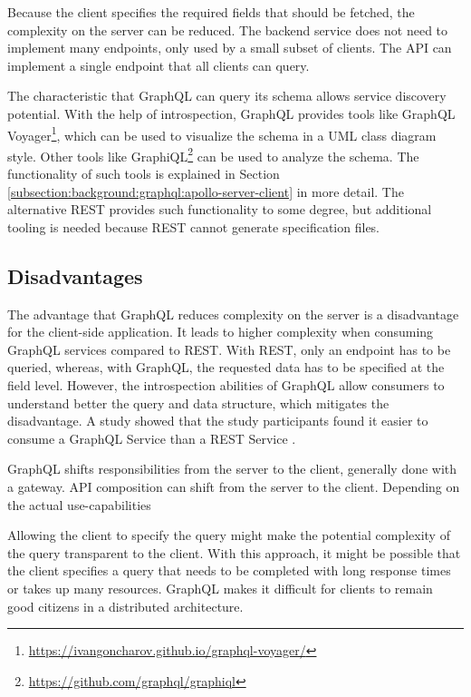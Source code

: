 \bigskip

\noindent Because the client specifies the required fields that should be fetched, the complexity on the server can be reduced. The backend service does not need to implement many endpoints, only used by a small subset of clients. The \ac{API} can implement a single endpoint that all clients can query. \cite{book:2018:richardson:background:bff:microservices-patterns}

\bigskip

\noindent The characteristic that GraphQL can query its schema allows service discovery potential. With the help of introspection, GraphQL provides tools like GraphQL Voyager\footnote{\url{https://ivangoncharov.github.io/graphql-voyager/}}, which can be used to visualize the schema in a \ac{UML} class diagram style. Other tools like GraphiQL\footnote{\url{https://github.com/graphql/graphiql}} can be used to analyze the schema. The functionality of such tools is explained in Section \ref{subsection:background:graphql:apollo-server-client} in more detail. The alternative \ac{REST} provides such functionality to some degree, but additional tooling is needed because \ac{REST} cannot generate specification files.

\subsection{Disadvantages}\label{subsection:background:graphql:graphql-disadvantages}

\noindent The advantage that GraphQL reduces complexity on the server is a disadvantage for the client-side application. It leads to higher complexity when consuming GraphQL services compared to \ac{REST}. With \ac{REST}, only an endpoint has to be queried, whereas, with GraphQL, the requested data has to be specified at the field level. However, the introspection abilities of GraphQL allow consumers to understand better the query and data structure, which mitigates the disadvantage. A study \cite{inproceedings:2020:brito:background:graphql:rest-vs-graphql} showed that the study participants found it easier to consume a GraphQL Service than a \ac{REST} Service \cite{inproceedings:2017:de-pauda:background:graphql:handling-anti-patterns}.

\bigskip

\noindent GraphQL shifts responsibilities from the server to the client, generally done with a gateway. \ac{API} composition can shift from the server to the client. Depending on the actual use-capabilities

\bigskip

\noindent Allowing the client to specify the query might make the potential complexity of the query transparent to the client. With this approach, it might be possible that the client specifies a query that needs to be completed with long response times or takes up many resources. GraphQL makes it difficult for clients to remain good citizens in a distributed architecture. \cite{book:2018:richardson:background:bff:microservices-patterns}





